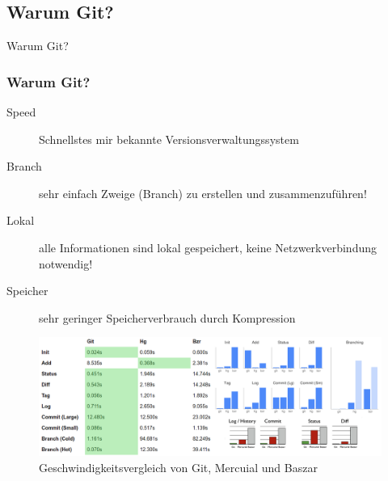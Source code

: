 \documentclass{beamer}
\begin{document}
\subsection{Warum Git?}
\begin{frame}[c]
\begin{center}
\begin{Huge}
Warum Git?
\end{Huge}
\end{center}
\end{frame}

\begin{frame}\frametitle{Warum Git?}
\begin{description}
\item[Speed] Schnellstes mir bekannte Versionsverwaltungssystem 
\item[Branch] sehr einfach Zweige (Branch) zu erstellen und zusammenzuführen!
\item[Lokal] alle Informationen sind lokal gespeichert, keine Netzwerkverbindung notwendig!
\item[Speicher] sehr geringer Speicherverbrauch durch Kompression
\end{description}

\begin{figure}
\includegraphics[scale=0.25]{Bilder/speed2} 
\caption{Geschwindigkeitsvergleich von Git, Mercuial und Baszar}
\end{figure}
\end{frame}
\end{document}
